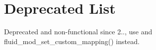 \chapter{Deprecated List}
\hypertarget{deprecated}{}\label{deprecated}

\begin{DoxyRefList}
\item[Member \doxylink{group__modulators_gga4b2419150b2a167df7807d5020a6e996a5ac8e594df1dff6c76d49c6258127d5a}{FLUID\+\_\+\+MOD\+\_\+\+SIN} ]\label{deprecated__deprecated000001}%
%
Deprecated and non-\/functional since 2.., use  and fluid\+\_\+mod\+\_\+set\+\_\+custom\+\_\+mapping() instead. 
\end{DoxyRefList}